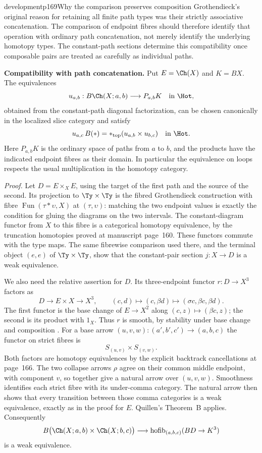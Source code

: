\begin{dcomment}{development}{p169}{Why the comparison preserves composition}
Grothendieck's original reason for retaining all finite path types was their strictly associative concatenation. The comparison of endpoint fibres should therefore identify that operation with ordinary path concatenation, not merely identify the underlying homotopy types. The constant-path sections determine this compatibility once composable pairs are treated as carefully as individual paths.

\textbf{Compatibility with path concatenation.}\ours\quad
Put $E=\Ch(X)$ and $K=BX$. The equivalences
\[
 u_{a,b}:B\Ch(X;a,b)\longrightarrow P_{a,b}K
 \quad\hbox{in }\Hot,
\]
obtained from the constant-path diagonal factorization, can be chosen canonically in the localized slice category and satisfy
\[
 u_{a,c}\,B(\mathord{*})
   =\mathord{*}_{\mathrm{top}}(u_{a,b}\times u_{b,c})
 \quad\hbox{in }\Hot.
\]
Here $P_{a,b}K$ is the ordinary space of paths from $a$ to $b$, and the products have the indicated endpoint fibres as their domain. In particular the equivalence on loops respects the usual multiplication in the homotopy category.

\emph{Proof.} Let $D=E\times_{X}E$, using the target of the first path and the source of the second. Its projection to $\Ty\times\Ty$ is the fibred Grothendieck construction with fibre
$\operatorname{Fun}(\tau*\upsilon,X)$ at $(\tau,\upsilon)$: matching the two endpoint values is exactly the condition for gluing the diagrams on the two intervals. The constant-diagram functor from $X$ to this fibre is a categorical homotopy equivalence, by the truncation homotopies proved at manuscript page~160. These functors commute with the type maps. The same fibrewise comparison used there, and the terminal object $(e,e)$ of $\Ty\times\Ty$, show that the constant-pair section $j:X\to D$ is a weak equivalence.

We also need the relative assertion for $D$. Its three-endpoint functor $r:D\to X^3$ factors as
\[
 D\longrightarrow E\times X\longrightarrow X^3,
 \qquad
 (c,d)\longmapsto(c,\beta d)
       \longmapsto(\sigma c,\beta c,\beta d).
\]
The first functor is the base change of $E\to X^2$ along $(c,z)\mapsto(\beta c,z)$; the second is its product with $1_X$. Thus $r$ is smooth, by stability under base change and composition \citep[Proposition~4.7]{Maltsiniotis2005Asphericite}. For a base arrow $(u,v,w):(a',b',c')\to(a,b,c)$ the functor on strict fibres is
\[
 S_{(u,v)}\times S_{(v,w)}.
\]
Both factors are homotopy equivalences by the explicit backtrack cancellations at page~166. The two collapse arrows $\rho$ agree on their common middle endpoint, with component $v$, so together give a natural arrow over $(u,v,w)$. Smoothness identifies each strict fibre with its under-comma category. The natural arrow then shows that every transition between those comma categories is a weak equivalence, exactly as in the proof for $E$. Quillen's Theorem~B applies. Consequently
\[
 B\bigl(\Ch(X;a,b)\times\Ch(X;b,c)\bigr)
     \longrightarrow\operatorname{hofib}_{(a,b,c)}(BD\to K^3)
\]
is a weak equivalence.


\end{dcomment}
